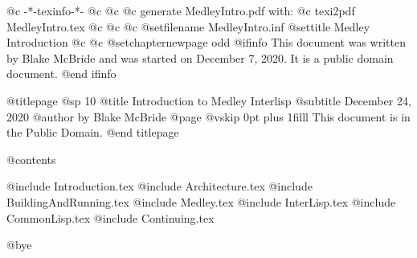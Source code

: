     @c -*-texinfo-*-
@c
@c
@c generate MedleyIntro.pdf with:
@c         texi2pdf MedleyIntro.tex
@c
@c
@c %
@setfilename MedleyIntro.inf
@settitle Medley Introduction
@c %
@c @setchapternewpage odd
@ifinfo
This document was written by Blake McBride and was started
on December 7, 2020.  It is a public domain document.
@end ifinfo

@titlepage
@sp 10
@title Introduction to Medley Interlisp
@subtitle December 24, 2020
@author by Blake McBride
@page
@vskip 0pt plus 1filll
This document is in the Public Domain.
@end titlepage

@contents

@include Introduction.tex
@include Architecture.tex
@include BuildingAndRunning.tex
@include Medley.tex
@include InterLisp.tex
@include CommonLisp.tex
@include Continuing.tex

@bye

